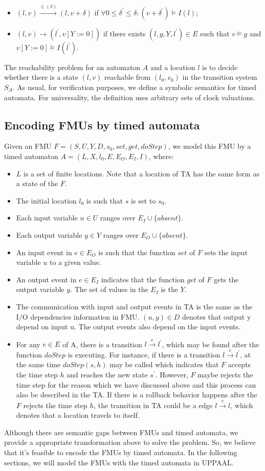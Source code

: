 \begin{itemize}
\item
$(l,v) \xrightarrow{\in(\delta)} (l,v+\delta)$ if $\forall0 \leqslant \delta^{\prime} \leqslant \delta : (v + \delta^{\prime}) \models I(l)$;
\item
$(l,v) \rightarrow(l^{\prime},v[Y := 0])$ if there exists $(l,g,Y,l^{\prime}) \in E$ such that $v \models g$ and $v[Y := 0 ] \models I(l^{\prime})$.
\end{itemize}
The reachability problem for an automaton $A$ and a location $l$ is to decide whether there is a state $(l,v)$ reachable from $(l_{0},v_{0})$ in the transition system $S_{A}$. As usual, for verification purposes, we define a symbolic semantics for timed automata. For universality, the definition uses arbitrary sets of clock valuations.
\subsection{Encoding FMUs by timed automata}
Given an FMU $F=(S,U,Y,D,s_{0},set,get,doStep)$, we model this FMU by a timed automaton $A = (L,X,l_{0},E,E_{O},E_{I},I)$, where:
\begin{itemize}
\item
$L$ is a set of finite locations. Note that a location of TA has the same form as a state of the $F$.
\item
The initial location $l_{0}$ is such that $s$ is set to $s_{0}$. 
\item
Each input variable $u \in U$ ranges over $E_{I} \cup \{absent\}$.
\item
Each output variable $y \in Y$ ranges over $E_{O} \cup \{absent\}$.
\item
An input event in $e \in E_{O}$ is such that the function $set$ of $F$ sets the input variable $u$ to a given value. 
\item
An output event in $e \in E_{I}$ indicates that the function $get$ of $F$ gets the output variable $y$. The set of values in the $E_{I}$ is the $Y$.  
\item
The communication with input and output events in TA is the same as the I/O dependencies information in FMU. $(u,y) \in D$ denotes that output y depend on input u. The output events also depend on the input events.
\item
For any $e \in E$ of A, there is a transition $l \xrightarrow{e} l^{\prime}$, which may be found after the function $doStep$ is executing. For instance, if there is a transition $l \xrightarrow{e} l^{\prime}$, at the same time $doStep(s,h)$ may be called which indicates that $F$ accepts the time step $h$ and reaches the new state $s^{\prime}$. However, $F$ maybe rejects the time step for the reason which we have discussed above and this process can also be described in the TA. If there is a rollback behavior happens after the $F$ rejects the time step $h$, the transition in TA could be a edge $l \xrightarrow{e} l$, which denotes that a location travels to itself.
\end{itemize}
Although there are semantic gaps between FMUs and timed automata, we provide a  appropriate transformation above to solve the problem. So, we believe that it's feasible to encode the FMUs by timed automata. In the following sections, we will model the FMUs with the timed automata in UPPAAL.



